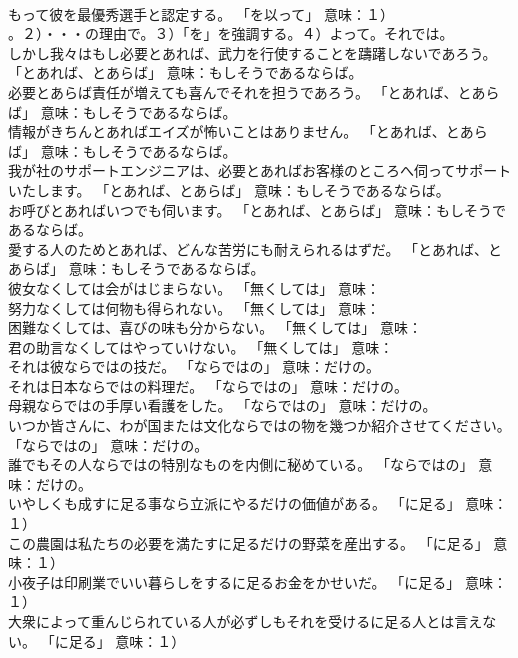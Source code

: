 \documentclass[8pt]{extreport}
\begin{document}
\begin{CJK}{UTF8}{min}
\\	もって彼を最優秀選手と認定する。	「を以って」 意味：１）
\\	。２）・・・の理由で。３）「を」を強調する。４）よって。それでは。	
\\	しかし我々はもし必要とあれば、武力を行使することを躊躇しないであろう。	「とあれば、とあらば」 意味：もしそうであるならば。	
\\	必要とあらば責任が増えても喜んでそれを担うであろう。	「とあれば、とあらば」 意味：もしそうであるならば。	
\\	情報がきちんとあればエイズが怖いことはありません。	「とあれば、とあらば」 意味：もしそうであるならば。	
\\	我が社のサポートエンジニアは、必要とあればお客様のところへ伺ってサポートいたします。	「とあれば、とあらば」 意味：もしそうであるならば。	
\\	お呼びとあればいつでも伺います。	「とあれば、とあらば」 意味：もしそうであるならば。	
\\	愛する人のためとあれば、どんな苦労にも耐えられるはずだ。	「とあれば、とあらば」 意味：もしそうであるならば。	
\\	彼女なくしては会がはじまらない。	「無くしては」 意味：
\\	努力なくしては何物も得られない。	「無くしては」 意味：
\\	困難なくしては、喜びの味も分からない。	「無くしては」 意味：
\\	君の助言なくしてはやっていけない。	「無くしては」 意味：
\\	それは彼ならではの技だ。	「ならではの」 意味：だけの。	
\\	それは日本ならではの料理だ。	「ならではの」 意味：だけの。	
\\	母親ならではの手厚い看護をした。	「ならではの」 意味：だけの。	
\\	いつか皆さんに、わが国または文化ならではの物を幾つか紹介させてください。	「ならではの」 意味：だけの。	
\\	誰でもその人ならではの特別なものを内側に秘めている。	「ならではの」 意味：だけの。	
\\	いやしくも成すに足る事なら立派にやるだけの価値がある。	「に足る」 意味：１）
\\	この農園は私たちの必要を満たすに足るだけの野菜を産出する。	「に足る」 意味：１）
\\	小夜子は印刷業でいい暮らしをするに足るお金をかせいだ。	「に足る」 意味：１）
\\	大衆によって重んじられている人が必ずしもそれを受けるに足る人とは言えない。	「に足る」 意味：１）

\end{CJK}
\end{document}
